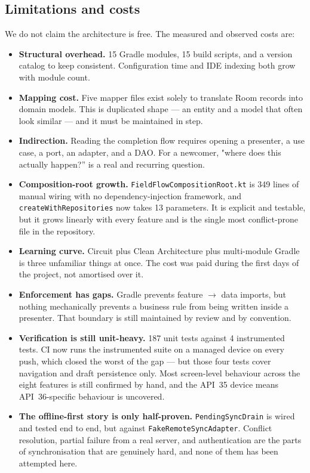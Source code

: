 \documentclass[11pt,a4paper]{article}
\newcommand{\file}[1]{{\small\texttt{#1}}}
\begin{document}
\subsection{Limitations and costs}

We do not claim the architecture is free. The measured and observed costs are:

\begin{itemize}[leftmargin=*]
  \item \textbf{Structural overhead.} 15 Gradle modules, 15 build scripts, and a
        version catalog to keep consistent. Configuration time and IDE indexing
        both grow with module count.
  \item \textbf{Mapping cost.} Five mapper files exist solely to translate Room
        records into domain models. This is duplicated shape --- an entity and a
        model that often look similar --- and it must be maintained in step.
  \item \textbf{Indirection.} Reading the completion flow requires opening a
        presenter, a use case, a port, an adapter, and a DAO. For a newcomer,
        "where does this actually happen?'' is a real and recurring question.
  \item \textbf{Composition-root growth.} \file{FieldFlowCompositionRoot.kt} is
        349 lines of manual wiring with no dependency-injection framework, and
        \texttt{createWithRepositories} now takes 13 parameters. It is explicit
        and testable, but it grows linearly with every feature and is the single
        most conflict-prone file in the repository.
  \item \textbf{Learning curve.} Circuit plus Clean Architecture plus
        multi-module Gradle is three unfamiliar things at once. The cost was paid
        during the first days of the project, not amortised over it.
  \item \textbf{Enforcement has gaps.} Gradle prevents feature $\rightarrow$ data
        imports, but nothing mechanically prevents a business rule from being
        written inside a presenter. That boundary is still maintained by review
        and by convention.
  \item \textbf{Verification is still unit-heavy.} 187 unit tests against 4
        instrumented tests. CI now runs the instrumented suite on a managed
        device on every push, which closed the worst of the gap --- but those
        four tests cover navigation and draft persistence only. Most
        screen-level behaviour across the eight features is still confirmed by
        hand, and the API~35 device means API~36-specific behaviour is
        uncovered.
  \item \textbf{The offline-first story is only half-proven.}
        \file{PendingSyncDrain} is wired and tested end to end, but against
        \file{FakeRemoteSyncAdapter}. Conflict resolution, partial failure from
        a real server, and authentication are the parts of synchronisation that
        are genuinely hard, and none of them has been attempted here.
\end{itemize}
\end{document}
